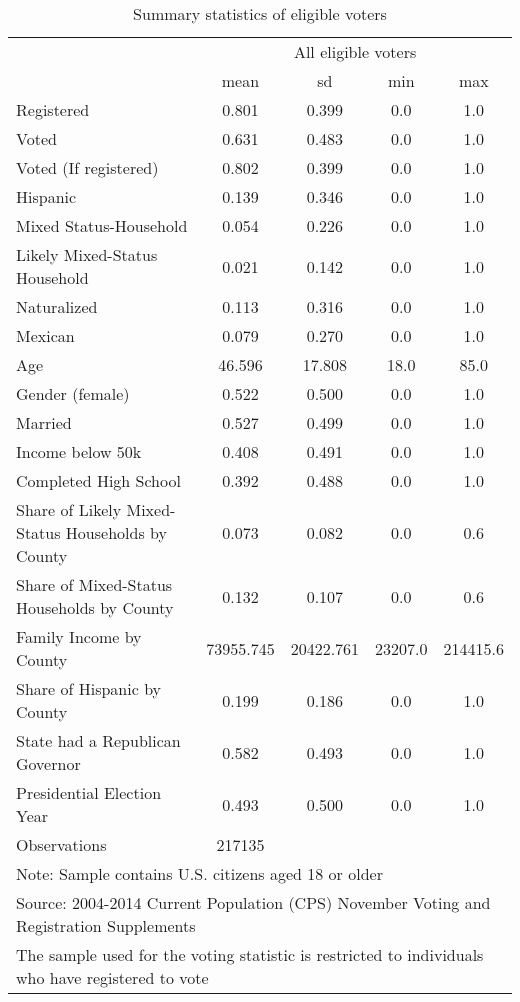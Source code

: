 \begin{table}[htbp]\centering
\def\sym#1{\ifmmode^{#1}\else\(^{#1}\)\fi}
\caption{Summary statistics of eligible voters}
\begin{tabular}{l*{1}{cccc}}
\toprule
                &\multicolumn{4}{c}{All eligible voters}\\
                &     mean&       sd&      min&      max\\
\midrule
Registered      &    0.801&    0.399&      0.0&      1.0\\
Voted           &    0.631&    0.483&      0.0&      1.0\\
Voted (If registered)&    0.802&    0.399&      0.0&      1.0\\
Hispanic        &    0.139&    0.346&      0.0&      1.0\\
Mixed Status-Household&    0.054&    0.226&      0.0&      1.0\\
Likely Mixed-Status Household&    0.021&    0.142&      0.0&      1.0\\
Naturalized     &    0.113&    0.316&      0.0&      1.0\\
Mexican         &    0.079&    0.270&      0.0&      1.0\\
Age             &   46.596&   17.808&     18.0&     85.0\\
Gender (female) &    0.522&    0.500&      0.0&      1.0\\
Married         &    0.527&    0.499&      0.0&      1.0\\
Income below 50k&    0.408&    0.491&      0.0&      1.0\\
Completed High School&    0.392&    0.488&      0.0&      1.0\\
Share of Likely Mixed-Status Households by County&    0.073&    0.082&      0.0&      0.6\\
Share of Mixed-Status Households by County&    0.132&    0.107&      0.0&      0.6\\
Family Income by County&73955.745&20422.761&  23207.0& 214415.6\\
Share of Hispanic by County&    0.199&    0.186&      0.0&      1.0\\
State had a Republican Governor&    0.582&    0.493&      0.0&      1.0\\
Presidential Election Year&    0.493&    0.500&      0.0&      1.0\\
\midrule
Observations    &   217135&         &         &         \\
\bottomrule
\multicolumn{5}{l}{\footnotesize Note: Sample contains U.S. citizens aged 18 or older}\\
\multicolumn{5}{l}{\footnotesize Source: 2004-2014 Current Population (CPS) November Voting and Registration Supplements}\\
\multicolumn{5}{l}{\footnotesize The sample used for the voting statistic is restricted to individuals who have registered to vote}\\
\end{tabular}
\end{table}
